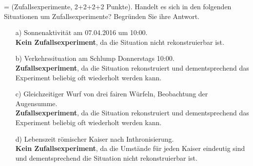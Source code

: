 \documentclass[twoside]{article}
\begin{document}
\ifnum\ZettelEins=\True
{}
%
%
(Zufallsexperimente, 2+2+2+2 Punkte).
Handelt es sich in den folgenden Situationen um Zufallsexperimente?
Begründen Sie ihre Antwort.
\begin{enumerate}
	\item[a)] Sonnenaktivität am 07.04.2016 um 10:00.\\
	\textbf{Kein Zufallsexperiment}, da die Situation nicht rekonstruierbar ist.
	
	\item[b)] Verkehrssituation am Schlump Donnerstags 10:00.\\
	\textbf{Zufallsexperiment}, da die Situation rekonstruiert und dementsprechend das Experiment beliebig oft wiederholt werden kann.
	
	\item[c)] Gleichzeitiger Wurf von drei fairen Würfeln, Beobachtung der Augensumme.\\
	\textbf{Zufallsexperiment}, da die Situation rekonstruiert und dementsprechend das Experiment beliebig oft wiederholt werden kann.
	
	\item[d)] Lebenszeit römischer Kaiser nach Inthronisierung.\\
	\textbf{Kein Zufallsexperiment}, da die Umstände für jeden Kaiser eindeutig sind und dementsprechend die Situation nicht rekonstruierbar ist.
	
	
\end{enumerate}
\end{document}
